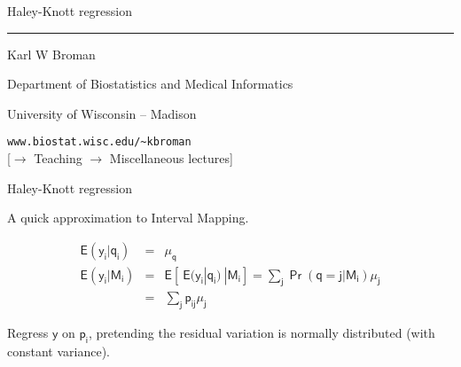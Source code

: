 \documentclass[12pt]{article}
\newcommand{\titlesize}{\fontsize{40}{50} \selectfont}
\newcommand{\headsize}{\fontsize{35}{35} \selectfont}
\newcommand{\textsize}{\fontsize{30}{35} \selectfont}
\newcommand{\smallsize}{\fontsize{25}{30} \selectfont}
\newcommand{\smallersize}{\fontsize{20}{25} \selectfont}
\newcommand{\smallestsize}{\fontsize{18}{22} \selectfont}
\begin{document}
\thispagestyle{empty}

\begin{center}
\titlesize \color{myyellow}

\vspace*{15mm}

Haley-Knott regression

\color{mypink}
\rule{10in}{1mm}

\vspace{5mm}

\textsize \color{myblue}
Karl W Broman
\vspace{5mm}

\color{mywhite}
{\smallsize Department of Biostatistics and Medical Informatics

University of Wisconsin -- Madison
\vspace{20mm}


\verb|www.biostat.wisc.edu/~kbroman| \\
{\smallestsize \color{myblue} 
[$\rightarrow$ Teaching $\rightarrow$ Miscellaneous lectures]}
}

\end{center}

\newpage

\headsize \color{myyellow}
\hfill \begin{minipage}{5.75in}
\centering
Haley-Knott regression
\end{minipage}

\vspace{3cm}

\color{mywhite} \smallsize

\hspace*{0.5in}
A quick approximation to Interval Mapping.

\smallersize

\begin{eqnarray*}
\mathsf{E(y_i | q_i)} & = & \mathsf{ \mu_q } \\[24pt]
\mathsf{E(y_i | M_i)} & = & \mathsf{E[ \ E(y_i|q_i) \ | M_i]} 
 =  \mathsf{\textstyle{\sum_j \Pr(q=j|M_i) \mu_j}} \\[12pt]
& = & \mathsf{\textstyle{\sum_j p_{ij} \mu_j}}
\end{eqnarray*}

\vspace{1cm}

\hfill \begin{minipage}{10in}
\setlength{\rightskip}{0pt plus 1fil} %
{\color{mypink} Regress $\mathsf{y}$ on $\mathsf{p_i}$}, pretending the residual
variation is normally distributed (with constant variance).
\end{minipage}
\end{document}
